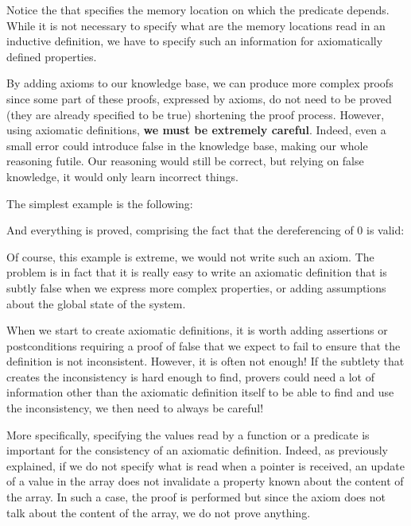 


Notice the  that specifies the memory location
on which the predicate depends. While it is not necessary to specify what are
the memory locations read in an inductive definition, we have to specify such
an information for axiomatically defined properties.




By adding axioms to our knowledge base, we can produce more complex
proofs since some part of these proofs, expressed by axioms, do not need
to be proved (they are already specified to be true) shortening
the proof process. However, using axiomatic definitions, \textbf{we must
be extremely careful}. Indeed, even a small error could introduce false
in the knowledge base, making our whole reasoning futile. Our reasoning
would still be correct, but relying on false knowledge, it would only
learn incorrect things.



The simplest example is the following:






And everything is proved, comprising the fact that the dereferencing of
0 is valid:





Of course, this example is extreme, we would not write such an axiom.
The problem is in fact that it is really easy to write an axiomatic
definition that is subtly false when we express more complex properties,
or adding assumptions about the global state of the system.







When we start to create axiomatic definitions, it is worth adding
assertions or postconditions requiring a proof of false that we expect
to fail to ensure that the definition is not inconsistent. However, it
is often not enough! If the subtlety that creates the inconsistency is
hard enough to find, provers could need a lot of information other than
the axiomatic definition itself to be able to find and use the
inconsistency, we then need to always be careful!




More specifically, specifying the values read by a function or a
predicate is important for the consistency of an axiomatic definition.
Indeed, as previously explained, if we do not specify what is read when
a pointer is received, an update of a value in the array does not
invalidate a property known about the content of the array. In such a
case, the proof is performed but since the axiom does not talk about the
content of the array, we do not prove anything.




